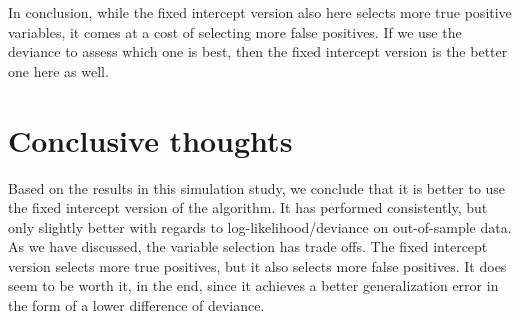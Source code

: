 In conclusion, while the fixed intercept version also here selects more true positive variables, it comes at a cost of selecting more false positives.
If we use the deviance to assess which one is best, then the fixed intercept version is the better one here as well.

\section{Conclusive thoughts}
Based on the results in this simulation study, we conclude that it is better to use the fixed intercept version of the algorithm.
It has performed consistently, but only slightly better with regards to log-likelihood/deviance on out-of-sample data.
As we have discussed, the variable selection has trade offs.
The fixed intercept version selects more true positives, but it also selects more false positives.
It does seem to be worth it, in the end, since it achieves a better generalization error in the form of a lower difference of deviance.

